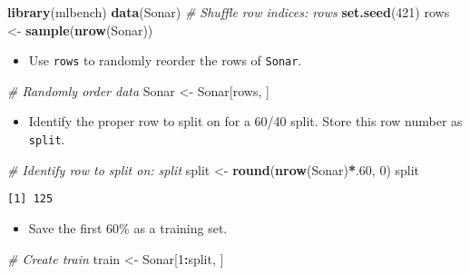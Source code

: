 \documentclass[]{book}
\newenvironment{Shaded}{\begin{snugshade}}{\end{snugshade}}
\newcommand{\KeywordTok}[1]{\textcolor[rgb]{0.13,0.29,0.53}{\textbf{#1}}}
\newcommand{\DecValTok}[1]{\textcolor[rgb]{0.00,0.00,0.81}{#1}}
\newcommand{\StringTok}[1]{\textcolor[rgb]{0.31,0.60,0.02}{#1}}
\newcommand{\CommentTok}[1]{\textcolor[rgb]{0.56,0.35,0.01}{\textit{#1}}}
\newcommand{\OperatorTok}[1]{\textcolor[rgb]{0.81,0.36,0.00}{\textbf{#1}}}
\newcommand{\NormalTok}[1]{#1}
\providecommand{\tightlist}{%
  \setlength{\itemsep}{0pt}\setlength{\parskip}{0pt}}
\begin{document}
\begin{Shaded}
\begin{Highlighting}[]
\KeywordTok{library}\NormalTok{(mlbench)}
\KeywordTok{data}\NormalTok{(Sonar)}
\CommentTok{# Shuffle row indices: rows}
\KeywordTok{set.seed}\NormalTok{(}\DecValTok{421}\NormalTok{)}
\NormalTok{rows <-}\StringTok{ }\KeywordTok{sample}\NormalTok{(}\KeywordTok{nrow}\NormalTok{(Sonar))}
\end{Highlighting}
\end{Shaded}

\begin{itemize}
\tightlist
\item
  Use \texttt{rows} to randomly reorder the rows of \texttt{Sonar}.
\end{itemize}

\begin{Shaded}
\begin{Highlighting}[]
\CommentTok{# Randomly order data}
\NormalTok{Sonar <-}\StringTok{ }\NormalTok{Sonar[rows, ]}
\end{Highlighting}
\end{Shaded}

\begin{itemize}
\tightlist
\item
  Identify the proper row to split on for a 60/40 split. Store this row
  number as \texttt{split}.
\end{itemize}

\begin{Shaded}
\begin{Highlighting}[]
\CommentTok{# Identify row to split on: split}
\NormalTok{split <-}\StringTok{ }\KeywordTok{round}\NormalTok{(}\KeywordTok{nrow}\NormalTok{(Sonar)}\OperatorTok{*}\NormalTok{.}\DecValTok{60}\NormalTok{, }\DecValTok{0}\NormalTok{)}
\NormalTok{split}
\end{Highlighting}
\end{Shaded}

\begin{verbatim}
[1] 125
\end{verbatim}

\begin{itemize}
\tightlist
\item
  Save the first 60\% as a training set.
\end{itemize}

\begin{Shaded}
\begin{Highlighting}[]
\CommentTok{# Create train}
\NormalTok{train <-}\StringTok{ }\NormalTok{Sonar[}\DecValTok{1}\OperatorTok{:}\NormalTok{split, ]}
\end{Highlighting}
\end{Shaded}
\end{document}
